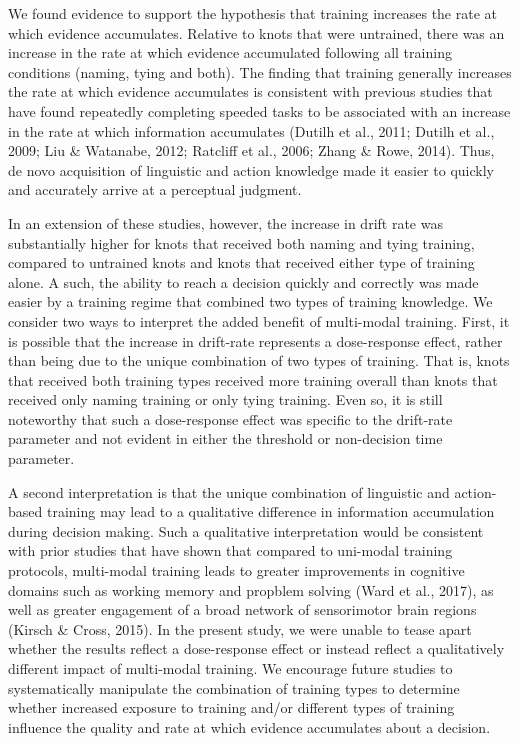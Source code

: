 \documentclass[
  man, donotrepeattitle,floatsintext]{apa6}
\begin{document}
We found evidence to support the hypothesis that training increases the rate at which evidence accumulates. Relative to knots that were untrained, there was an increase in the rate at which evidence accumulated following all training conditions (naming, tying and both). The finding that training generally increases the rate at which evidence accumulates is consistent with previous studies that have found repeatedly completing speeded tasks to be associated with an increase in the rate at which information accumulates (Dutilh et al., 2011; Dutilh et al., 2009; Liu \& Watanabe, 2012; Ratcliff et al., 2006; Zhang \& Rowe, 2014). Thus, de novo acquisition of linguistic and action knowledge made it easier to quickly and accurately arrive at a perceptual judgment.

In an extension of these studies, however, the increase in drift rate was substantially higher for knots that received both naming and tying training, compared to untrained knots and knots that received either type of training alone. A such, the ability to reach a decision quickly and correctly was made easier by a training regime that combined two types of training knowledge. We consider two ways to interpret the added benefit of multi-modal training. First, it is possible that the increase in drift-rate represents a dose-response effect, rather than being due to the unique combination of two types of training. That is, knots that received both training types received more training overall than knots that received only naming training or only tying training. Even so, it is still noteworthy that such a dose-response effect was specific to the drift-rate parameter and not evident in either the threshold or non-decision time parameter.

A second interpretation is that the unique combination of linguistic and action-based training may lead to a qualitative difference in information accumulation during decision making. Such a qualitative interpretation would be consistent with prior studies that have shown that compared to uni-modal training protocols, multi-modal training leads to greater improvements in cognitive domains such as working memory and propblem solving (Ward et al., 2017), as well as greater engagement of a broad network of sensorimotor brain regions (Kirsch \& Cross, 2015). In the present study, we were unable to tease apart whether the results reflect a dose-response effect or instead reflect a qualitatively different impact of multi-modal training. We encourage future studies to systematically manipulate the combination of training types to determine whether increased exposure to training and/or different types of training influence the quality and rate at which evidence accumulates about a decision.
\end{document}
